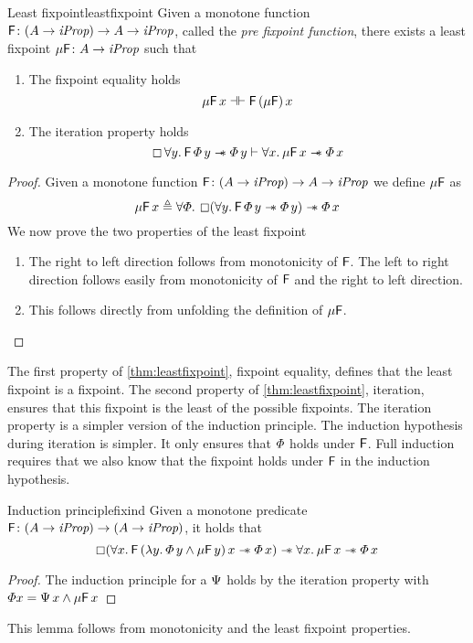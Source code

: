 \documentclass[thesis.tex]{subfiles}
\begin{document}
\begin{theorem}{Least fixpoint}{leastfixpoint}
  Given a monotone function $\textsf{\upshape F}\colon (A \to \textit{iProp}) \to  A \to \textit{iProp}$, called the \emph{pre fixpoint function}, there exists a least fixpoint $\mu\textsf{\upshape F}\colon  A \to \textit{iProp}$ such that
  \begin{enumerate}
    \item The fixpoint equality holds
          \[ \mu\textsf{\upshape F}\, x \mathrel{\dashv\vdash} \textsf{\upshape F}\, (\mu\textsf{\upshape F})\, x \]
    \item The iteration property holds
          \[ \always \All \varB. \hopred\, \pred\, \varB \wand \pred\, \varB \proves \All \var. \lfp\hopred\, \var \wand \pred\, \var \]
  \end{enumerate}
\end{theorem}
\begin{proof}
  Given a monotone function $\textsf{\upshape F}\colon (A \to \textit{iProp}) \to  A \to \textit{iProp}$ we define $\mu\textsf{\upshape F}$ as
  \[ \lfp\hopred\, \var \eqdef \All \pred. \always(\All \varB. \hopred\, \pred\, \varB \wand \pred\, \varB) \wand \pred \, \var \]
  We now prove the two properties of the least fixpoint
  \begin{enumerate}
    \item The right to left direction follows from monotonicity of $\textsf{\upshape F}$. The left to right direction follows easily from monotonicity of $\textsf{\upshape F}$ and the right to left direction.
    \item This follows directly from unfolding the definition of $\mu\textsf{\upshape F}$. \qedhere
  \end{enumerate}
\end{proof}
\noindent The first property of \cref{thm:leastfixpoint}, fixpoint equality, defines that the least fixpoint is a fixpoint. The second property of \cref{thm:leastfixpoint}, iteration, ensures that this fixpoint is the least of the possible fixpoints. The iteration property is a simpler version of the induction principle. The induction hypothesis during iteration is simpler. It only ensures that $\varPhi$ holds under $\textsf{\upshape F}$. Full induction requires that we also know that the fixpoint holds under $\textsf{\upshape F}$ in the induction hypothesis.
\begin{lemma}{Induction principle}{fixind}
  Given a monotone predicate $\textsf{\upshape F}\colon (A \to \textit{iProp}) \to (A \to \textit{iProp})$, it holds that
  \[\always(\All\var.\hopred\,(\Lam\varB. \pred\,\varB \land \lfp\hopred\,\varB)\,\var \wand \pred\,\var) \wand \All\var. \lfp\hopred\,\var \wand \pred\,\var\]
\end{lemma}
\begin{proof}
  The induction principle for a $\Psi$ holds by the iteration property with $\varPhi x = \Psi\, x \land \mu\textsf{\upshape F}\, x$
\end{proof}
This lemma follows from monotonicity and the least fixpoint properties.
\end{document}
